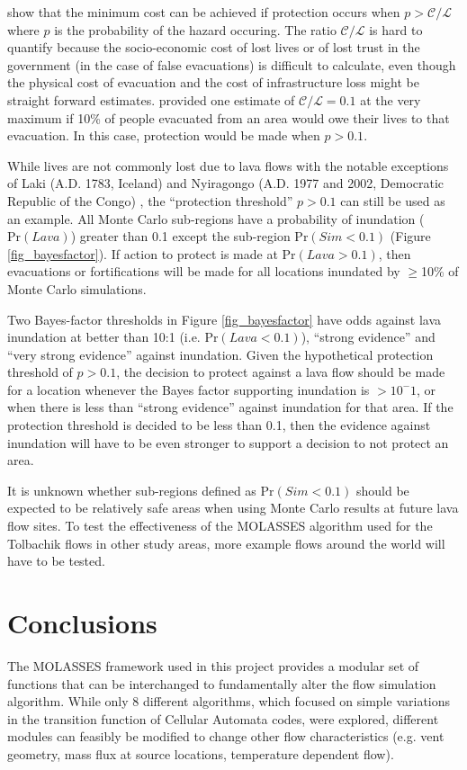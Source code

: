 	\citet{marzocchi2007probabilistic} show that the minimum cost can be achieved if protection occurs when $p>\mathcal{C}/\mathcal{L}$ where $p$ is the probability of the hazard occuring. The ratio $\mathcal{C}/\mathcal{L}$ is hard to quantify because the socio-economic cost of lost lives or of lost trust in the government (in the case of false evacuations) is difficult to calculate, even though the physical cost of evacuation and the cost of infrastructure loss might be straight forward estimates. \citet{woo2008probabilistic} provided one estimate of $\mathcal{C}/\mathcal{L}=0.1$ at the very maximum if 10\% of people evacuated from an area would owe their lives to that evacuation. In this case, protection would be made when $p>0.1$.
	
	While lives are not commonly lost due to lava flows with the notable exceptions of Laki (A.D. 1783, Iceland) and Nyiragongo (A.D. 1977 and 2002, Democratic Republic of the Congo) \citep{peterson2000lava}, the ``protection threshold'' $p>0.1$ can still be used as an example. All Monte Carlo sub-regions have a probability of inundation ($\text{Pr}(Lava)$) greater than 0.1 except the sub-region $\text{Pr}(Sim<0.1)$ (Figure \ref{fig_bayesfactor}). If action to protect is made at $\text{Pr}(Lava>0.1)$, then evacuations or fortifications will be made for all locations inundated by $\ge$10\% of Monte Carlo simulations.
	
	Two Bayes-factor thresholds in Figure \ref{fig_bayesfactor} have odds against lava inundation at better than 10:1 (i.e. $\text{Pr}(Lava<0.1)$), ``strong evidence'' and ``very strong evidence'' against inundation. Given the hypothetical protection threshold of $p>0.1$, the decision to protect against a lava flow should be made for a location whenever the Bayes factor supporting inundation is $>10^-1$, or when there is less than ``strong evidence'' against inundation for that area. If the protection threshold is decided to be less than 0.1, then the evidence against inundation will have to be even stronger to support a decision to not protect an area. 
	
	It is unknown whether sub-regions defined as $\text{Pr}(Sim<0.1)$ should be expected to be relatively safe areas when using Monte Carlo results at future lava flow sites. To test the effectiveness of the MOLASSES algorithm used for the Tolbachik flows in other study areas, more example flows around the world will have to be tested.
		
		
\section{Conclusions}
	The MOLASSES framework used in this project provides a modular set of functions that can be interchanged to fundamentally alter the flow simulation algorithm. While only 8 different algorithms, which focused on simple variations in the transition function of Cellular Automata codes, were explored, different modules can feasibly be modified to change other flow characteristics (e.g. vent geometry, mass flux at source locations, temperature dependent flow).
	

